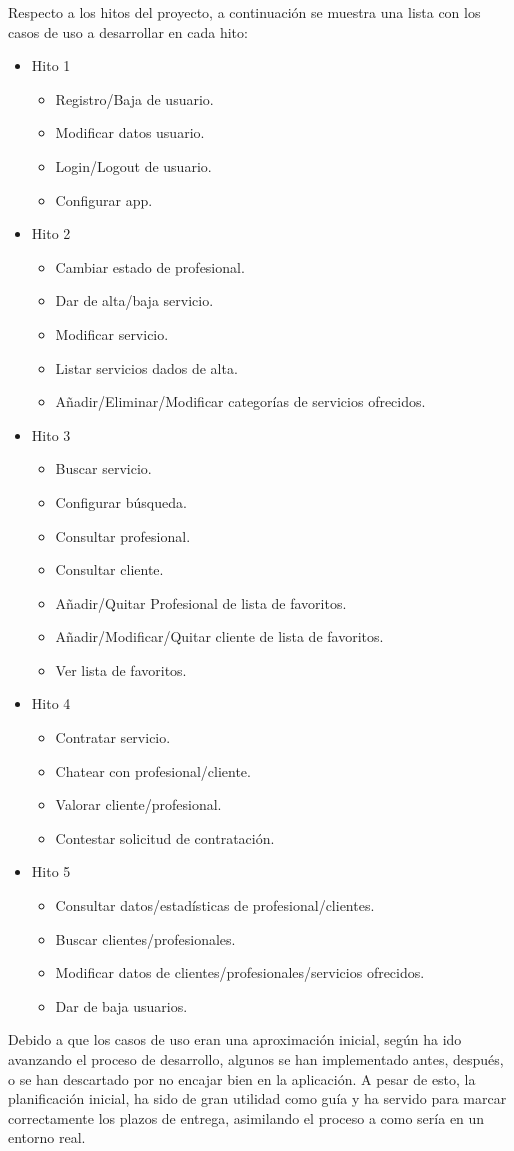 Respecto a los hitos del proyecto, a continuación se muestra una lista con los casos de uso a desarrollar en cada hito:
\begin{itemize}
	\item Hito 1
	\begin{itemize}
		\item Registro/Baja de usuario.
		\item Modificar datos usuario.
		\item Login/Logout de usuario.
		\item Configurar app.
	\end{itemize}
	\item Hito 2
	\begin{itemize}
		\item Cambiar estado de profesional.
		\item Dar de alta/baja servicio.
		\item Modificar servicio.
		\item Listar servicios dados de alta.
		\item Añadir/Eliminar/Modificar categorías de servicios ofrecidos.
	\end{itemize}
	\item Hito 3
	\begin{itemize}
		\item Buscar servicio.
		\item Configurar búsqueda.
		\item Consultar profesional.
		\item Consultar cliente.
		\item Añadir/Quitar Profesional de lista de favoritos.
		\item Añadir/Modificar/Quitar cliente de lista de favoritos.
		\item Ver lista de favoritos.
	\end{itemize}
	\item Hito 4
	\begin{itemize}
		\item Contratar servicio.
		\item Chatear con profesional/cliente.
		\item Valorar cliente/profesional.
		\item Contestar solicitud de contratación.
	\end{itemize}
	\item Hito 5
	\begin{itemize}
		\item Consultar datos/estadísticas de profesional/clientes.
		\item Buscar clientes/profesionales.
		\item Modificar datos de clientes/profesionales/servicios ofrecidos.
		\item Dar de baja usuarios.
	\end{itemize}
\end{itemize}
Debido a que los casos de uso eran una aproximación inicial, según ha ido avanzando el proceso de desarrollo, algunos se han implementado antes, después, o se han descartado por no encajar bien en la aplicación. A pesar de esto, la planificación inicial, ha sido de gran utilidad como guía y ha servido para marcar correctamente los plazos de entrega, asimilando el proceso a como sería en un entorno real.